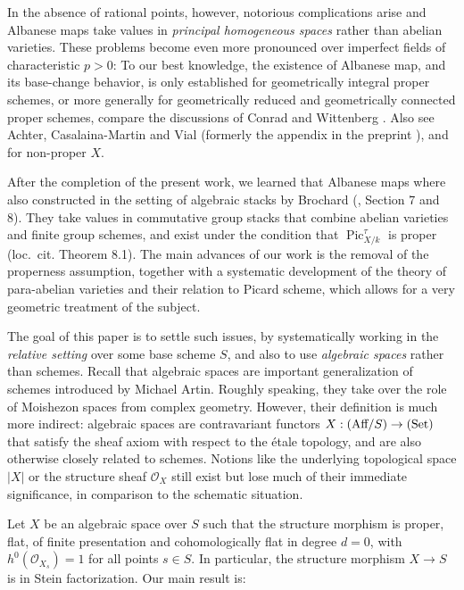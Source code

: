 \documentclass[oneside, 12pt]{amsart}
\theoremstyle{definition}
\theoremstyle{remark}
\newcommand{\Aff}{\text{\rm Aff}}
\renewcommand{\O}{\mathscr{O}}
\newcommand{\Pic}{\operatorname{Pic}}
\newcommand{\ra}{\rightarrow}
\newcommand{\Set}{{\text{\rm Set}}}
\begin{document}
In the absence of rational points,  however, notorious complications arise  and  
Albanese maps take  values in   \emph{principal homogeneous spaces} rather than   abelian varieties.
These problems become even more pronounced over imperfect fields of characteristic $p>0$:
To our best knowledge, the existence of Albanese map, and its base-change behavior,
is only established for geometrically integral proper schemes, or more generally for geometrically reduced and 
geometrically connected proper schemes,
compare the discussions of Conrad \cite{Conrad 2017} and Wittenberg  \cite{Wittenberg 2008}.
Also see Achter, Casalaina-Martin and Vial \cite{Achter; Casalaina-Martin; Vial 2022} (formerly the appendix in the preprint \cite{Achter; Casalaina-Martin; Vial 2019}),
and \cite{Schroeer 2022} for non-proper $X$.

After the completion of the present work, we learned that Albanese maps where also constructed  in the setting of 
algebraic stacks by Brochard (\cite{Brochard 2021}, Section 7 and 8). They take values in commutative group stacks
that combine abelian varieties and finite group schemes, and exist under the condition that  $\Pic^\tau_{X/k}$ is proper
(loc.\ cit. Theorem 8.1).  The main advances of our work is the removal of the properness assumption, together with a  systematic 
development of the theory of para-abelian varieties and their relation to Picard scheme, which allows for a  
very geometric treatment of the subject.

The goal of this paper is to settle such issues, 
by systematically working in the \emph{relative setting} over some base scheme $S$,
and also to use  \emph{algebraic spaces} rather than schemes.
Recall that algebraic spaces are   important generalization of schemes  introduced by Michael Artin.
Roughly speaking,  they take over the role of   Moishezon spaces from complex geometry.  
However, their definition is much more indirect:
algebraic spaces are   contravariant functors $X:(\Aff/S)\ra(\Set)$ that satisfy the sheaf axiom
with respect to the \'etale topology, and are also otherwise  closely related to schemes.
Notions like the   underlying topological space
$|X|$ or the structure sheaf $\O_X$ still exist  but lose much of  their immediate significance, in comparison to the schematic situation.

Let $X$ be an algebraic space over $S$ 
such that the structure morphism  is proper, flat,  of finite presentation and  cohomologically flat
in degree $d=0$, with $h^0(\O_{X_s})=1$ for all points $s\in S$.  In particular, the structure morphism
$X\ra S$ is in Stein factorization. Our main result is:
\end{document}
